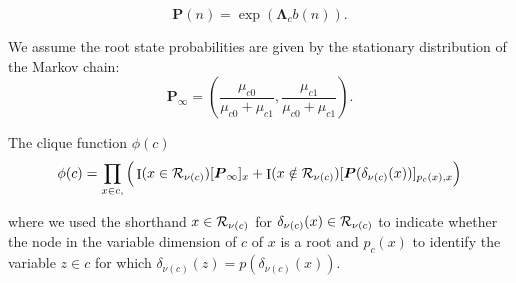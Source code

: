 \documentclass[
11pt, %
oneside, %
english, %
singlespacing, %
headsepline, %
chapterinoneline, %
]{MastersDoctoralThesis} %
\DeclareMathOperator{\Ind}{I}
\def\bLambda{\boldsymbol{\Lambda}}
\def\bP{\boldsymbol{P}}
\def\R{{\cal R}}
\begin{document}
\begin{equation}
	\bP(n) = \exp(\bLambda_c b(n)).
\end{equation}

We assume the root state probabilities are given by the stationary distribution of the Markov chain:
\begin{equation}
	\bP_{\infty} = \left(\frac{\mu_{c0}}{\mu_{c0} + \mu_{c1}}, \frac{\mu_{c1}}{\mu_{c0} + \mu_{c1}}\right).
\end{equation}


The clique function $\phi(c)$
\begin{equation}
	\phi(c) = \prod_{x \in c, }\Big( \Ind(x \in \R_{\nu(c)})[\bP_{\infty}]_x + \Ind(x \notin \R_{\nu(c)}) [\bP(\delta_{\nu(c)}(x))]_{p_{c}(x), x} \Big)
\end{equation}

where we used the shorthand $x \in \R_{\nu(c)}$ for $\delta_{\nu(c)}(x) \in \R_{\nu(c)}$ to indicate whether the node in the variable dimension of $c$ of $x$ is a root and $p_{c}(x)$ to identify the variable $z \in c$ for which $\delta_{\nu(c)}(z) = p(\delta_{\nu(c)}(x))$.
\end{document}
